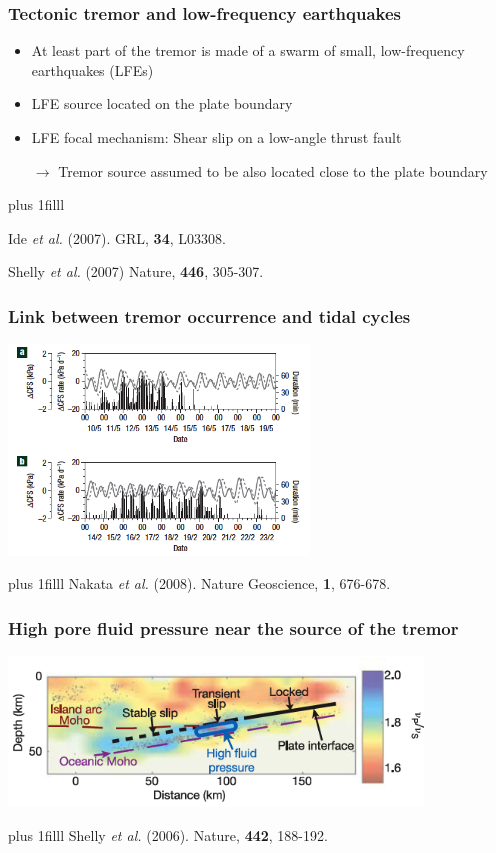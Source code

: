 \documentclass{beamer}
\newcommand{\btVFill}{\vskip0pt plus 1filll}
\begin{document}
	\begin{frame}
		\frametitle{Tectonic tremor and low-frequency earthquakes}
		\vspace{2em}

		\begin{itemize}
			\item At least part of the tremor is made of a swarm of small, low-frequency earthquakes (LFEs)
			\item LFE source located on the plate boundary
			\item LFE focal mechanism: Shear slip on a low-angle thrust fault

			\vspace{2em}

			$\rightarrow$ Tremor source assumed to be also located close to the plate boundary
		\end{itemize}
		\btVFill
		\tiny{Ide \textit{et al.} (2007). GRL, \textbf{34}, L03308.

		Shelly \textit{et al.} (2007) Nature, \textbf{446}, 305-307.}
	\end{frame}

	\begin{frame}
		\frametitle{Link between tremor occurrence and tidal cycles}
		\begin{center}
			\includegraphics[trim={0cm 0cm 0cm 0cm}, clip, width=8cm]{articles/nakata_al_2008_2.png}
		\end{center}
		\btVFill
		\tiny{Nakata \textit{et al.} (2008). Nature Geoscience, \textbf{1}, 676-678.}
	\end{frame}

	\begin{frame}
		\frametitle{High pore fluid pressure near the source of the tremor}
		\begin{center}
			\includegraphics[trim={0cm 0cm 0cm 0cm}, clip, width=11cm]{articles/shelly_al_2006_4d.png}
		\end{center}
		\btVFill
		\tiny{Shelly \textit{et al.} (2006). Nature, \textbf{442}, 188-192.}
	\end{frame}
\end{document}
